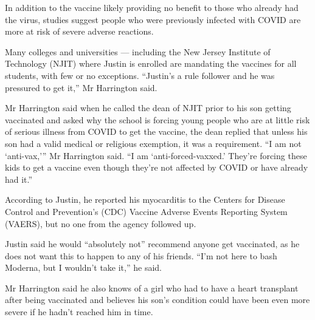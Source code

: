In addition to the vaccine likely providing no benefit to those who already had
the virus, studies suggest people who were previously infected with COVID are
more at risk of severe adverse reactions.

Many colleges and universities — including the New Jersey Institute of
Technology (NJIT) where Justin is enrolled are mandating the vaccines for all
students, with few or no exceptions. “Justin’s a rule follower and he was
pressured to get it,” Mr Harrington said.

Mr Harrington said when he called the dean of NJIT prior to his son getting vaccinated and asked why the school is forcing young people who are at little risk of serious illness from COVID to get the vaccine, the dean replied that unless his son had a valid medical or religious exemption, it was a requirement.
“I am not ‘anti-vax,’” Mr Harrington said. “I am ‘anti-forced-vaxxed.’ They’re forcing these kids to get a vaccine even though they’re not affected by COVID or have already had it.”

According to Justin, he reported his myocarditis to the Centers for Disease
Control and Prevention’s (CDC) Vaccine Adverse Events Reporting System (VAERS),
but no one from the agency followed up.

Justin said he would “absolutely not” recommend anyone get vaccinated, as he
does not want this to happen to any of his friends. “I’m not here to bash
Moderna, but I wouldn’t take it,” he said.

Mr Harrington said he also knows of a girl who had to have a heart transplant
after being vaccinated and believes his son’s condition could have been even
more severe if he hadn’t reached him in time.


